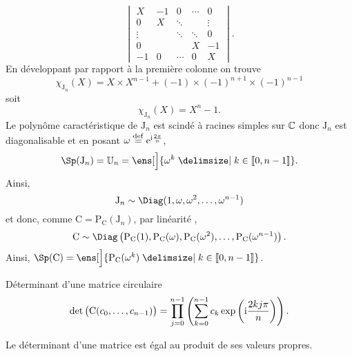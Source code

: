 \begin{preuve}
$$\begin{vmatrix}
        X & -1 & 0 & \cdots & 0 \\
        0 & X & \ddots & & \vdots \\
        \vdots & & \ddots & \ddots & 0 \\
        0 & & & X & -1 \\
        -1 & 0 & \cdots & 0 & X
        \end{vmatrix}.
    $$
    En développant par rapport à la première colonne on trouve
    $$\chi_{\mathrm{J}_n}(X) = X \times X^{n-1} + (-1) \times (-1)^{n+1} \times (-1)^{n-1}$$
    soit 
    $$\chi_{\mathrm{J}_n}(X) = X^n-1.$$
    Le polynôme caractéristique de $\mathrm{J}_n$ est scindé à racines simples sur $\mathbb{C}$ donc $\mathrm{J}_n$ est diagonalisable et en posant $\omega \overset{\mathrm{\tiny def}}{=} \mathrm{e}^{\mathrm{i} \frac{2 \pi}{n}}$, 
    $$\Sp(\mathrm{J}_n) = \mathbb{U}_n = \ens[\Big]{ \omega^k \tq k \in \llbracket 0, n-1 \rrbracket }.$$
    Ainsi, 
    $$\mathrm{J}_n \sim \Diag(1, \omega, \omega^2, \dots, \omega^{n-1})$$
    et donc, comme $\mathrm{C} = \mathrm{P}_{\mathrm{C}}(\mathrm{J}_n)$, par linéarité \note, 
    $$\mathrm{C} \sim \Diag \left(\mathrm{P}_\mathrm{C}(1), \mathrm{P}_\mathrm{C}(\omega), \mathrm{P}_\mathrm{C}(\omega^2), \dots,\mathrm{P}_\mathrm{C}(\omega^{n-1}) \right).$$
    Ainsi, $\Sp(\mathrm{C}) = \ens[\Big]{ \mathrm{P}_\mathrm{C}(\omega^k) \tq k \in \llbracket 0, n-1 \rrbracket }$.
\end{preuve}    


\begin{prop}{Déterminant d'une matrice circulaire}
    $$\det \big( \mathrm{C}(c_0, \dots, c_{n-1}) \big) = \prod_{j=0}^{n-1} \left( \sum_{k=0}^{n-1} c_k \exp \left( \mathrm{i} \frac{2kj \pi}{n} \right) \right).$$
\end{prop}

\begin{preuve}
    Le déterminant d'une matrice est égal au produit de ses valeurs propres.
\end{preuve}

